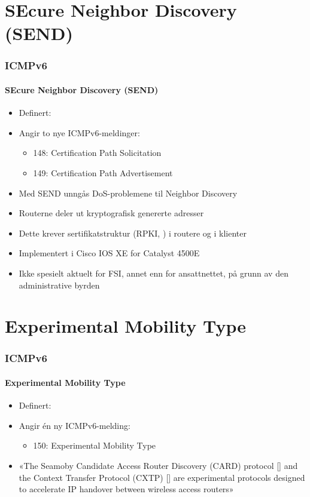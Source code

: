 \section{SEcure Neighbor Discovery (SEND)}
\begin{frame}
  \frametitle{ICMPv6}
  \framesubtitle{SEcure Neighbor Discovery (SEND)}
  \begin{itemize}
  \item Definert: 
  \item Angir to nye ICMPv6-meldinger:
    \begin{itemize}
    \item 148: Certification Path Solicitation
    \item 149: Certification Path Advertisement
    \end{itemize}
  \item Med SEND unngås DoS-problemene til Neighbor Discovery
  \item Routerne deler ut kryptografisk genererte adresser 
  \item Dette krever sertifikatstruktur (RPKI, ) i routere og i klienter
  \item Implementert i Cisco IOS XE for Catalyst 4500E
  \item Ikke spesielt aktuelt for FSI, annet enn for ansattnettet, på
    grunn av den administrative byrden
  \end{itemize}
\end{frame}

\section{Experimental Mobility Type}
\begin{frame}
  \frametitle{ICMPv6}
  \framesubtitle{Experimental Mobility Type}
  \begin{itemize}
  \item Definert: 
  \item Angir én ny ICMPv6-melding:
    \begin{itemize}
    \item 150: Experimental Mobility Type
    \end{itemize}
  \item «The Seamoby Candidate Access Router Discovery (CARD) protocol
    [] and the Context Transfer Protocol (CXTP) []
    are experimental protocols designed to accelerate IP handover
    between wireless access routers»
  \end{itemize}
\end{frame}


